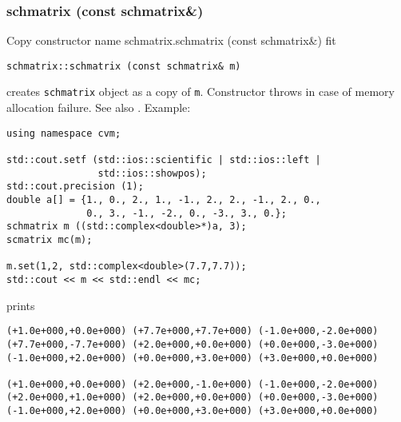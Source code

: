 \subsubsection{schmatrix (const schmatrix\&)}
Copy constructor%
\pdfdest name {schmatrix.schmatrix (const schmatrix&)} fit
\begin{verbatim}
schmatrix::schmatrix (const schmatrix& m)
\end{verbatim}
creates  \verb"schmatrix" object as a copy of \verb"m".
Constructor throws  
in case of memory allocation failure.
See also .
Example:
\begin{Verbatim}
using namespace cvm;

std::cout.setf (std::ios::scientific | std::ios::left |
                std::ios::showpos); 
std::cout.precision (1);
double a[] = {1., 0., 2., 1., -1., 2., 2., -1., 2., 0.,
              0., 3., -1., -2., 0., -3., 3., 0.};
schmatrix m ((std::complex<double>*)a, 3);
scmatrix mc(m);

m.set(1,2, std::complex<double>(7.7,7.7));
std::cout << m << std::endl << mc;
\end{Verbatim}
prints
\begin{Verbatim}
(+1.0e+000,+0.0e+000) (+7.7e+000,+7.7e+000) (-1.0e+000,-2.0e+000)
(+7.7e+000,-7.7e+000) (+2.0e+000,+0.0e+000) (+0.0e+000,-3.0e+000)
(-1.0e+000,+2.0e+000) (+0.0e+000,+3.0e+000) (+3.0e+000,+0.0e+000)

(+1.0e+000,+0.0e+000) (+2.0e+000,-1.0e+000) (-1.0e+000,-2.0e+000)
(+2.0e+000,+1.0e+000) (+2.0e+000,+0.0e+000) (+0.0e+000,-3.0e+000)
(-1.0e+000,+2.0e+000) (+0.0e+000,+3.0e+000) (+3.0e+000,+0.0e+000)
\end{Verbatim}
\newpage





